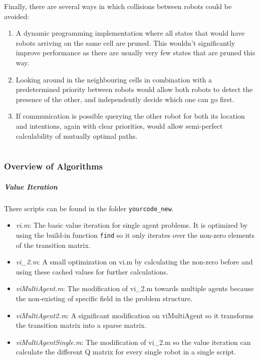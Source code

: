 \documentclass[10pt,a4paper]{article}
\begin{document}
Finally, there are several ways in which collisions between robots could be avoided:
\begin{enumerate}
	\item A dynamic programming implementation where all states that would have robots arriving on the same cell are pruned.
	This wouldn't significantly improve performance as there are usually very few states that are pruned this way.
	\item Looking around in the neighbouring cells in combination with a predetermined priority between robots would allow both robots to detect the presence of the other, and independently decide which one can go first.
	\item If communication is possible querying the other robot for both its location and intentions, again with clear priorities, would allow semi-perfect calculability of mutually optimal paths.
\end{enumerate}



\part{}


\section{Overview of Algorithms}

\subsubsection*{Value Iteration}
There scripts can be found in the folder \texttt{yourcode\_new}.
\begin{itemize}
	\item \emph{vi.m}: The basic value iteration for single agent problems. It is optimized by using the build-in function \texttt{find} so it only iterates over the non-zero elements of the transition matrix.
	\item \emph{vi\_2.m}: A small optimization on vi.m by calculating the non-zero before and using these cached values for further calculations. 
	\item \emph{viMultiAgent.m}: The modification of vi\_2.m towards multiple agents because the non-existing of specific field in the problem structure.
	\item \emph{viMultiAgent2.m}: A significant modification on viMultiAgent so it transforms the transition matrix into a sparse matrix.
	\item \emph{viMultiAgentSingle.m}: The modification of vi\_2.m so the value iteration can calculate the different Q matrix for every single robot in a single script. 
	
\end{itemize}
\end{document}
